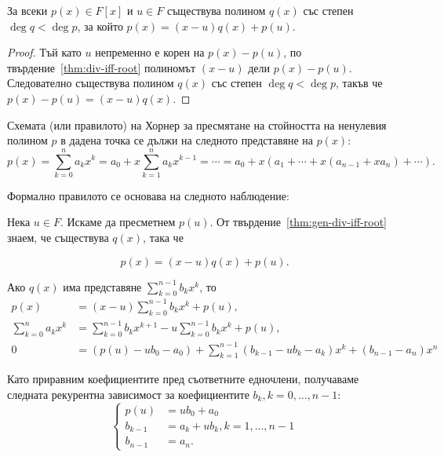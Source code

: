 \documentclass[numbers=endperiod, DIV=15, bibliography=totocnumbered]{scrartcl}
\begin{document}
\begin{proposition}\label{thm:gen-div-iff-root}
  За всеки $p(x) \in F[x]$ и $u \in F$ съществува полином $q(x)$ със степен $\deg q < \deg p$, за който $p(x) = (x - u) q(x) + p(u)$.
\end{proposition}
\begin{proof}
  Тъй като $u$ непременно е корен на $p(x) - p(u)$, по твърдение~\ref{thm:div-iff-root} полиномът $(x - u)$ дели $p(x) - p(u)$. Следователно съществува полином $q(x)$ със степен $\deg q < \deg p$, такъв че $p(x) - p(u) = (x - u) q(x)$.
\end{proof}

Схемата (или правилото) на Хорнер за пресмятане на стойността на ненулевия полином $p$ в дадена точка се дължи на следното представяне на $p(x)$:
\begin{displaymath}
  p(x) = \sum_{k=0}^n a_k x^k = a_0 + x \sum_{k=1}^n a_k x^{k-1} = \cdots = a_0 + x (a_1 + \cdots + x(a_{n-1} + x a_n) + \cdots).
\end{displaymath}

Формално правилото се основава на следното наблюдение:

Нека $u \in F$. Искаме да пресметнем $p(u)$. От твърдение~\ref{thm:gen-div-iff-root} знаем, че съществува $q(x)$, така че

\begin{displaymath}
  p(x) = (x - u) q(x) + p(u).
\end{displaymath}

Ако $q(x)$ има представяне $\sum_{k=0}^{n-1} b_k x^k$, то
\begin{align*}
  p(x)
  &=
  (x - u) \sum_{k=0}^{n-1} b_k x^k + p(u),
  \\
  \sum_{k=0}^n a_k x^k
  &=
  \sum_{k=0}^{n-1} b_k x^{k+1} - u \sum_{k=0}^{n-1} b_k x^k + p(u),
  \\
  0
  &=
  (p(u) - u b_0 - a_0) + \sum_{k=1}^{n-1} (b_{k-1} - u b_k - a_k) x^k + (b_{n-1} - a_n) x^n
\end{align*}

Като приравним коефициентите пред съответните едночлени, получаваме следната рекурентна зависимост за коефициентите $b_k, k = 0, \ldots, n - 1$:
\begin{displaymath}
  \begin{cases}
    p(u) &= u b_0 + a_0 \\
    b_{k-1} &= a_k + u b_k, k = 1, \ldots, n - 1 \\
    b_{n-1} &= a_n.
  \end{cases}
\end{displaymath}
\end{document}
